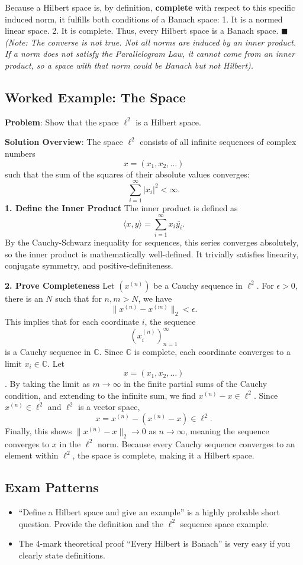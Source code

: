 \documentclass[
]{article}
\providecommand{\tightlist}{%
  \setlength{\itemsep}{0pt}\setlength{\parskip}{0pt}}
\begin{document}
Because a Hilbert space is, by definition, \textbf{complete} with
respect to this specific induced norm, it fulfills both conditions of a
Banach space: 1. It is a normed linear space. 2. It is complete. Thus,
every Hilbert space is a Banach space. \(\blacksquare\) \emph{(Note: The
converse is not true. Not all norms are induced by an inner product. If
a norm does not satisfy the Parallelogram Law, it cannot come from an
inner product, so a space with that norm could be Banach but not
Hilbert).}

\subsection{Worked Example: The Space}\label{worked-example-the-space}

\textbf{Problem}: Show that the space \(\ell^2\) is a Hilbert space.

\textbf{Solution Overview}: The space \(\ell^2\) consists of all
infinite sequences of complex numbers
\[
x = (x_1, x_2, \dots)
\]
such that the sum of the squares of their absolute values converges:
\[
\sum_{i=1}^\infty \lvert x_i \rvert^2 < \infty.
\]
\textbf{1. Define the Inner Product} The inner product is defined as
\[
\langle x, y \rangle = \sum_{i=1}^\infty x_i \overline{y_i}.
\]
By the Cauchy-Schwarz inequality for sequences, this series converges
absolutely, so the inner product is mathematically well-defined. It
trivially satisfies linearity, conjugate symmetry, and
positive-definiteness.

\textbf{2. Prove Completeness} Let \((x^{(n)})\) be a Cauchy sequence in
\(\ell^2\). For \(\epsilon > 0\), there is an \(N\) such that for
\(n, m > N\), we have
\[
\|x^{(n)} - x^{(m)}\|_2 < \epsilon.
\]
This implies that for each coordinate \(i\), the sequence
\[
(x_i^{(n)})_{n=1}^\infty
\]
is a Cauchy sequence in \(\mathbb{C}\). Since \(\mathbb{C}\) is
complete, each coordinate converges to a limit \(x_i \in \mathbb{C}\).
Let
\[
x = (x_1, x_2, \dots)
\]
. By taking the limit as \(m \to \infty\) in the finite partial sums of
the Cauchy condition, and extending to the infinite sum, we find
\(x^{(n)} - x \in \ell^2\). Since \(x^{(n)} \in \ell^2\) and \(\ell^2\)
is a vector space,
\[
x = x^{(n)} - (x^{(n)} - x) \in \ell^2.
\]
Finally, this shows \(\|x^{(n)} - x\|_2 \to 0\) as \(n \to \infty\),
meaning the sequence converges to \(x\) in the \(\ell^2\) norm. Because
every Cauchy sequence converges to an element within \(\ell^2\), the
space is complete, making it a Hilbert space.

\subsection{Exam Patterns}\label{exam-patterns-40}

\begin{itemize}
\tightlist
\item
  ``Define a Hilbert space and give an example'' is a highly probable
  short question. Provide the definition and the \(\ell^2\) sequence
  space example.
\item
  The 4-mark theoretical proof ``Every Hilbert is Banach'' is very easy
  if you clearly state definitions.
\end{itemize}
\end{document}
